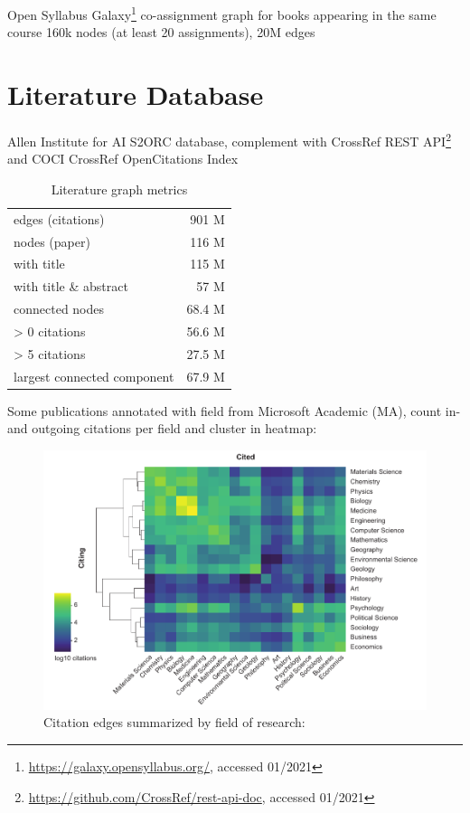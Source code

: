 Open Syllabus Galaxy\footnote{\url{https://galaxy.opensyllabus.org/}, accessed 01/2021}
co-assignment graph for books appearing in the same course
160k nodes (at least 20 assignments), 20M edges




\section{Literature Database}
\label{sec:state_of_art:database}

Allen Institute for AI S2ORC database, complement with CrossRef REST API\footnote{\url{https://github.com/CrossRef/rest-api-doc}, accessed 01/2021}
and COCI CrossRef OpenCitations Index


\begin{table}[ht]
	\centering
	\caption[Literature Graph Metrics]{Literature graph metrics}
	\label{tab:state_of_art:graph}
	\begin{tabular}{l|r}
		\hline
		edges (citations)           & 901 M 	\\
		nodes (paper)               & 116 M 	\\ \hline
		with title					& 115 M		\\
		with title \& abstract		&  57 M		\\ \hline
		connected nodes             &  68.4 M 	\\
		> 0 citations				&  56.6 M	\\
		> 5 citations				&  27.5 M	\\
		largest connected component &  67.9 M 	\\ \hline
	\end{tabular}
\end{table}

Some publications annotated with field from Microsoft Academic (MA), count in- and outgoing citations per field and cluster in heatmap:

\begin{figure}[h]
	\centering
	\includegraphics[width=1.0\textwidth]{figures/state_of_art/field_interactions.pdf}
	\captionsetup{format=plain}
	\caption[Scientific field interactions]{Citation edges summarized by field of research:}
	\label{fig:state_of_art:field_interactions}
\end{figure}

